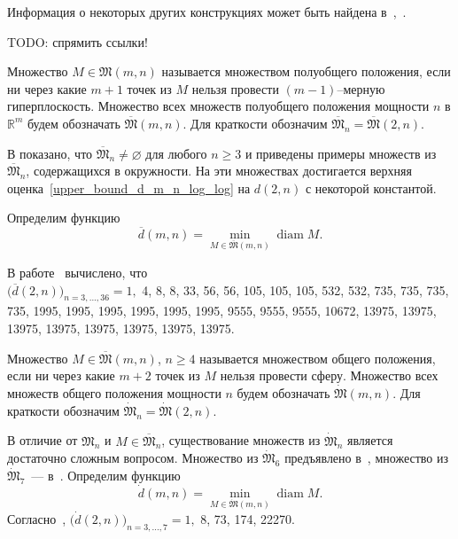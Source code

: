 Информация о некоторых других конструкциях может быть найдена в~\cite[\S 5.11]{brass2006research},~\cite[\S D20]{guy2013unsolved}.

TODO: спрямить ссылки!


\begin{definition}
	\cite{kurz2008minimum} Множество $M\in\mathfrak{M}(m,n)$ называется множеством полуобщего положения,
	если ни через какие $m+1$ точек из $M$ нельзя провести $(m-1)$--мерную гиперплоскость.
	Множество всех множеств полуобщего положения мощности $n$ в $\mathbb{R}^m$ будем обозначать $\overline{\mathfrak{M}}(m,n)$.
	Для краткости обозначим $\overline{\mathfrak{M}}_n=\overline{\mathfrak{M}}(2,n)$.
\end{definition}

В \cite{harborth1993upper} показано, что $\overline{\mathfrak{M}}_n\neq\varnothing$ для любого $n \geq 3$
и приведены примеры множеств из $\overline{\mathfrak{M}}_n$, содержащихся в окружности.
На эти множествах достигается верхняя оценка~\eqref{upper_bound_d_m_n_log_log} на $d(2,n)$
с некоторой константой.

Определим функцию~\cite{kurz2008minimum}
\begin{equation*}
	\overline{d}(m,n) = \min_{M\in\overline{\mathfrak{M}}(m,n)} \operatorname{diam} M
	.
\end{equation*}

В работе~\cite{kurz2008minimum} вычислено, что
\\
$\bigl(\overline{d}(2, n)\bigr)_{n=3,...,36} = 1,$
4, 8, 8, 33, 56, 56, 105, 105, 105, 532, 532, 735, 735, 735, 735,
1995, 1995, 1995, 1995, 1995, 1995, 9555, 9555, 9555, 10672,
13975, 13975, 13975, 13975, 13975, 13975, 13975, 13975.

\begin{definition}
	\cite{kurz2008minimum} Множество $M\in\overline{\mathfrak{M}}(m,n)$, $n\geq 4$ называется множеством общего положения,
	если ни через какие $m+2$ точек из $M$ нельзя провести сферу.
	Множество всех множеств общего положения мощности $n$ будем обозначать $\dot{\mathfrak{M}}(m,n)$.
	Для краткости обозначим $\dot{\mathfrak{M}}_n=\dot{\mathfrak{M}}(2,n)$.
\end{definition}

В отличие от $\mathfrak{M}_n$ и $M\in\overline{\mathfrak{M}}_n$,
существование множеств из $\dot{\mathfrak{M}}_n$ является достаточно сложным вопросом.
Множество из $\dot{\mathfrak{M}}_6$ предъявлено в~\cite{noll1989nclusters},
множество из $\dot{\mathfrak{M}}_7$~--- в~\cite{kurz2008minimum}.
Определим функцию~\cite{kurz2008minimum}
\begin{equation*}
	\dot{d}(m,n) = \min_{M\in\dot{\mathfrak{M}}(m,n)} \operatorname{diam} M
	.
\end{equation*}
Согласно~\cite{kurz2008minimum},
$\bigl(\dot{d}(2,n)\bigr)_{n=3,...,7}
= 1,$ 8, 73, 174, 22270.

